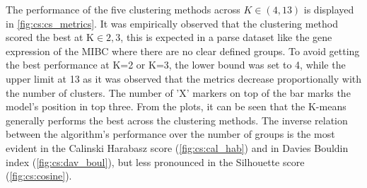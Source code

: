 The performance of the five clustering methods across $K\in(4, 13)$ is displayed in
\cref{fig:cs:cs_metrics}. It was empirically observed that the clustering method scored the best at K$\in{2,3}$, this is expected in a parse dataset like the gene expression of the MIBC where there are no clear defined groups. To avoid getting the best performance at K=2 or K=3, the lower bound was set to 4, while the upper limit at 13 as it was observed that the metrics decrease proportionally with the number of clusters. The number of 'X' markers on top of the bar marks the model's position in top three. From the plots, it can be seen that the K-means generally performs the best across the clustering methods. The inverse relation between the algorithm's performance over the number of groups is the most evident in the Calinski Harabasz score (\cref{fig:cs:cal_hab}) and in Davies Bouldin index (\cref{fig:cs:dav_boul}), but less pronounced in the Silhouette score (\cref{fig:cs:cosine}).

